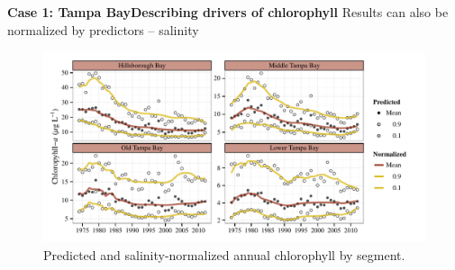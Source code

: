 \documentclass[serif]{beamer}\usepackage[]{graphicx}\usepackage[]{color}
\begin{document}
\begin{frame}{\textbf{Case 1: Tampa Bay}}{\textbf{Describing drivers of chlorophyll}}
Results can also be normalized by predictors -- salinity
\begin{figure}
\centerline{\includegraphics[width = \textwidth]{fig/prdnrm.pdf}}
\caption{Predicted and salinity-normalized annual chlorophyll by segment.}
\end{figure}
\end{frame}
\end{document}
